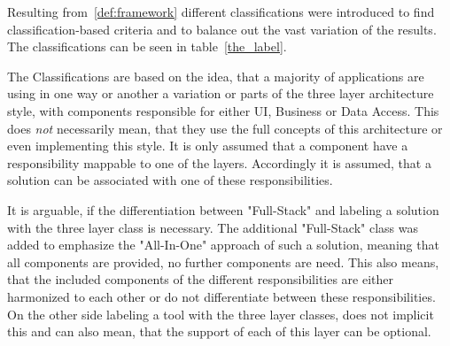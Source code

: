 Resulting from~\ref{def:framework} different classifications were introduced to 
find classification-based criteria and to balance out the vast variation of the 
results. The classifications can be seen in table~\ref{the_label}.

The Classifications are based on the idea, that a majority of applications are 
using in one way or another a variation or parts of the three layer architecture 
style, with components responsible for either UI, Business or Data Access. This 
does \textit{not} necessarily mean, that they use the full concepts of this 
architecture or even implementing this style. It is only assumed that a component 
have a responsibility mappable to one of the layers. Accordingly it is assumed, 
that a solution can be associated with one of these responsibilities.

It is arguable, if the differentiation between "Full-Stack" and labeling a 
solution with the three layer class is necessary. The additional "Full-Stack" 
class was added to emphasize the "All-In-One" approach of such a solution, meaning 
that all components are provided, no further components are need. This also means, 
that the included components of the different responsibilities are either 
harmonized to each other or do not differentiate between these responsibilities. 
On the other side labeling a tool with the three layer classes, does not implicit 
this and can also mean, that the support of each of this layer can be optional.